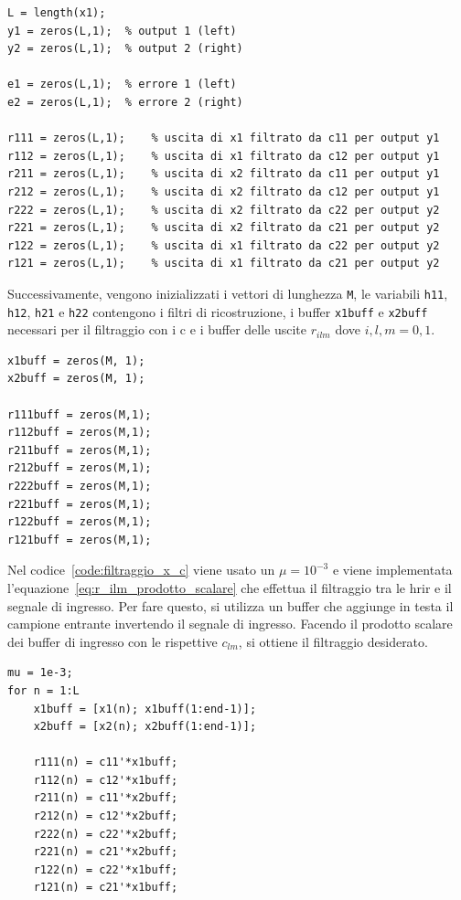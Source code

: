\documentclass[12pt,a4paper,titlepage]{article}
\begin{document}
\begin{lstlisting}[label=code:inizializzazione_vettori_L, caption=Inizializzazione dei vettori di lunghezza L, captionpos=b]
L = length(x1);
y1 = zeros(L,1);  % output 1 (left)
y2 = zeros(L,1);  % output 2 (right)

e1 = zeros(L,1);  % errore 1 (left)
e2 = zeros(L,1);  % errore 2 (right)

r111 = zeros(L,1);    % uscita di x1 filtrato da c11 per output y1
r112 = zeros(L,1);    % uscita di x1 filtrato da c12 per output y1
r211 = zeros(L,1);    % uscita di x2 filtrato da c11 per output y1
r212 = zeros(L,1);    % uscita di x2 filtrato da c12 per output y1
r222 = zeros(L,1);    % uscita di x2 filtrato da c22 per output y2
r221 = zeros(L,1);    % uscita di x2 filtrato da c21 per output y2
r122 = zeros(L,1);    % uscita di x1 filtrato da c22 per output y2
r121 = zeros(L,1);    % uscita di x1 filtrato da c21 per output y2
\end{lstlisting}

Successivamente, vengono inizializzati i vettori di lunghezza \texttt{M}, le variabili \texttt{h11},  \texttt{h12},  \texttt{h21} e  \texttt{h22} contengono i filtri di ricostruzione, i buffer \texttt{x1buff} e \texttt{x2buff} necessari per il filtraggio con i c e i buffer delle uscite $r_{ilm}$ dove $i, l, m = 0,1$.

\begin{lstlisting}[label=code:inizializzazione_vettori_M, caption=Inizializzazione dei vettori di lunghezza M, captionpos=b]
x1buff = zeros(M, 1);
x2buff = zeros(M, 1);

r111buff = zeros(M,1);    
r112buff = zeros(M,1);    
r211buff = zeros(M,1);  
r212buff = zeros(M,1);    
r222buff = zeros(M,1);    
r221buff = zeros(M,1);    
r122buff = zeros(M,1);   
r121buff = zeros(M,1);  
\end{lstlisting}

Nel codice~\ref{code:filtraggio_x_c} viene usato un $\mu = 10^{-3}$ e viene implementata l'equazione~\eqref{eq:r_ilm_prodotto_scalare} che effettua il filtraggio tra le hrir e il segnale di ingresso. Per fare questo, si utilizza un buffer che aggiunge in testa il campione entrante invertendo il segnale di ingresso. Facendo il prodotto scalare dei buffer di ingresso con le rispettive $c_{lm}$, si ottiene il filtraggio desiderato.

\begin{lstlisting}[label=code:filtraggio_x_c, caption=Filtraggio del segnale di ingresso con le hrir, captionpos=b]
mu = 1e-3; 
for n = 1:L
    x1buff = [x1(n); x1buff(1:end-1)];
    x2buff = [x2(n); x2buff(1:end-1)];
   
    r111(n) = c11'*x1buff;
    r112(n) = c12'*x1buff;
    r211(n) = c11'*x2buff;
    r212(n) = c12'*x2buff;
    r222(n) = c22'*x2buff;
    r221(n) = c21'*x2buff;
    r122(n) = c22'*x1buff;
    r121(n) = c21'*x1buff;
\end{lstlisting}
\end{document}
